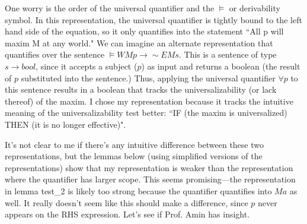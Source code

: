 \begin{isabellebody}
\begin{isamarkuptext}
One worry is the order of the universal quantifier and the $\vDash$ or derivability symbol. In this 
representation, the universal quantifier is tightly bound to the left hand side of the equation, so it 
only quantifies into the statement ``All p will maxim M at any world." We can imagine an alternate
representation that quantifies over the sentence $\vDash W M p \longrightarrow \sim E M s$. This is 
a sentence of type $s \longrightarrow bool$, since it accepts a subject ($p$) as input and returns 
a boolean (the result of $p$ substituted into the sentence.) Thus, applying the universal quantifier 
$\forall p$ to this sentence results in a boolean that tracks the universalizability (or lack thereof) 
of the maxim. I chose my representation because it tracks the intuitive meaning of the universalizability 
test better: ``IF (the maxim is universalized) THEN (it is no longer effective)".

It's not clear to me if there's any intuitive difference between these two representations, but the lemmas 
below (using simplified versions of the representations) show that my representation is weaker than 
the representation where the quantifier has larger scope. This seems promising—the representation in 
lemma test\_2 is likely too strong because the quantifier quantifies into $M a$ as well. It really 
doesn't seem like this should make a difference, since $p$ never appears on the RHS expression. Let's
see if Prof. Amin has insight.%
\end{isamarkuptext}\isamarkuptrue%
%
\isadelimproof
%
\endisadelimproof
%
\isatagproof
%
\endisatagproof
{\isafoldproof}%
%
\isadelimproof
%
\endisadelimproof
%
\isadelimproof
%
\endisadelimproof
%
\isatagproof
%
\endisatagproof
{\isafoldproof}%
%
\isadelimproof
%
\endisadelimproof
%
\isadelimproof
%
\endisadelimproof
%
\isatagproof
%
\endisatagproof
{\isafoldproof}%
%
\isadelimproof
%
\endisadelimproof
%
\isadelimproof
%
\endisadelimproof
%
\isatagproof
%
\endisatagproof
{\isafoldproof}%
%
\isadelimproof
%
\endisadelimproof
%
\isadelimtheory
%
\endisadelimtheory
%
\isatagtheory
%
\endisatagtheory
{\isafoldtheory}%
%
\isadelimtheory
%
\endisadelimtheory
%
\end{isabellebody}%
\endinput
